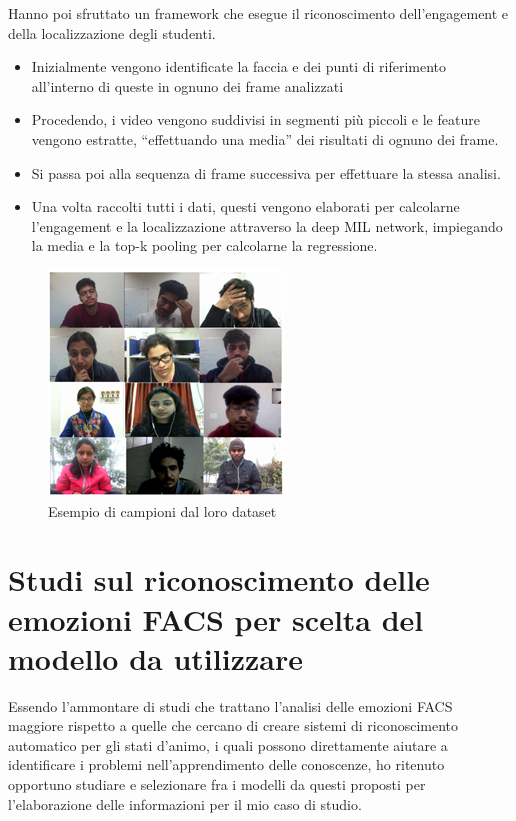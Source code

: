 Hanno poi sfruttato un framework che esegue il riconoscimento dell’engagement e della localizzazione degli studenti.
\begin{itemize}
    \item Inizialmente vengono identificate la faccia e dei punti di riferimento all’interno di queste in ognuno dei frame analizzati 
    \item Procedendo, i video vengono suddivisi in segmenti più piccoli e le feature vengono estratte, “effettuando una media” dei risultati di ognuno dei frame.
    \item Si passa poi alla sequenza di frame successiva per effettuare la stessa analisi.
    \item Una volta raccolti tutti i dati, questi vengono elaborati per calcolarne l’engagement e la localizzazione attraverso la deep MIL network, impiegando la media e la top-k pooling per calcolarne la regressione.
\end{itemize}


\begin{figure}
    \begin{center}    
        \includegraphics[width=0.8\linewidth]{images/4.png}
        \caption{Esempio di campioni dal loro dataset}
    \end{center}
\end{figure}


\section{Studi sul riconoscimento delle emozioni FACS per scelta del modello da utilizzare}
Essendo l’ammontare di studi che trattano l’analisi delle emozioni FACS maggiore rispetto a quelle che cercano di creare sistemi di riconoscimento automatico per gli stati d’animo, i quali possono direttamente aiutare a identificare i problemi nell’apprendimento delle conoscenze, ho ritenuto opportuno studiare e selezionare fra i modelli da questi proposti per l’elaborazione delle informazioni per il mio caso di studio.

